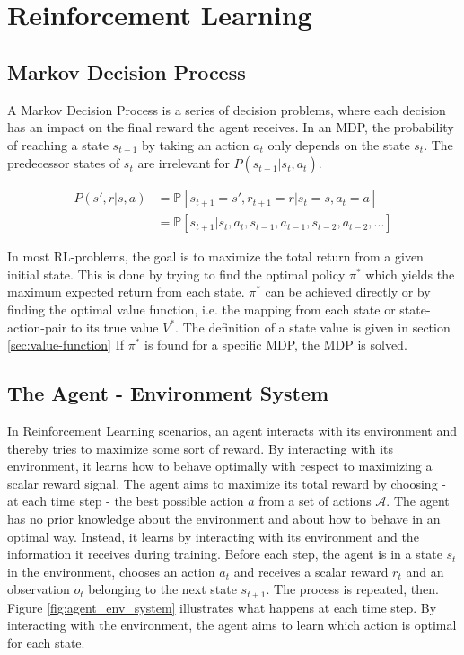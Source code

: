 \chapter{Reinforcement Learning}

\section{Markov Decision Process}

A Markov Decision Process is a series of decision problems, where each decision has an impact on the final reward the agent receives. In an MDP, the probability of reaching a state $s_{t+1}$ by taking an action $a_t$ only depends on the state $s_t$. The predecessor states of $s_t$ are irrelevant for $P(s_{t+1}|s_t,a_t)$.

\begin{align}
P(s',r|s,a)&=\mathbb{P}[s_{t+1}=s',r_{t+1}=r|s_t=s,a_t=a] \\
&= \mathbb{P}[s_{t+1}|s_t,a_t,s_{t-1},a_{t-1},s_{t-2},a_{t-2},...]
\end{align}

In most RL-problems, the goal is to maximize the total return from a given initial state. This is done by trying to find the optimal policy $\pi^*$ which yields the maximum expected return from each state. $\pi^*$ can be achieved directly or by finding the optimal value function, i.e. the mapping from each state or state-action-pair to its true value $V^*$. The definition of a state value is given in section \ref{sec:value-function} If $\pi^*$ is found for a specific MDP, the MDP is solved.

\section{The Agent - Environment System}

In Reinforcement Learning scenarios, an agent interacts with its environment and thereby tries to maximize some sort of reward. By interacting with its environment, it learns how to behave optimally with respect to maximizing a scalar reward signal. The agent aims to maximize its total reward by choosing - at each time step - the best possible action $a$ from a set of actions $\mathcal{A}$. 
The agent has no prior knowledge about the environment and about how to behave in an optimal way. Instead, it learns by interacting with its environment and the information it receives during training. Before each step, the agent is in a state $s_t$ in the environment, chooses an action $a_t$ and receives a scalar reward $r_t$ and an observation $o_t$ belonging to the next state $s_{t+1}$. The process is repeated, then. Figure \ref{fig:agent_env_system} illustrates what happens at each time step. By interacting with the environment, the agent aims to learn which action is optimal for each state. 


